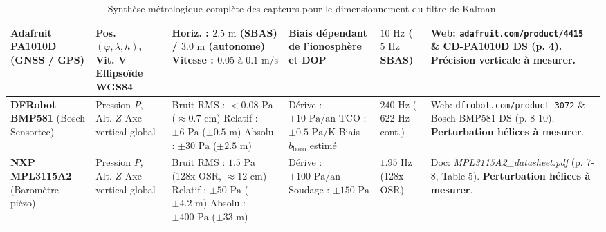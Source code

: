 \documentclass[../Formulations_Kalman.tex]{subfiles}
\begin{document}
\begin{table}[htbp]
\begin{tabular}{p{2.6cm} p{2.2cm} p{3.2cm} p{2.5cm} p{1.1cm} p{4.0cm}}
\midrule
\textbf{Adafruit PA1010D} \newline (GNSS / GPS) & Pos. $(\varphi, \lambda, h)$, Vit. $\mathbf{V}$ \newline Ellipsoïde WGS84 & Horiz. : $2.5\text{ m}$ (SBAS) / $3.0\text{ m}$ (autonome) \newline Vitesse : $0.05\text{ à }0.1\text{ m/s}$ & Biais dépendant de l'ionosphère et DOP & $10\text{ Hz}$ \newline ($5\text{ Hz}$ SBAS) & Web: \texttt{adafruit.com/product/4415} \& CD-PA1010D DS (p. 4). \newline \textbf{Précision verticale à mesurer}. \\
\midrule
\textbf{DFRobot BMP581} \newline (Bosch Sensortec) & Pression $P$, Alt. $Z$ \newline Axe vertical global & Bruit RMS : $< 0.08\text{ Pa}$ ($\approx 0.7\text{ cm}$) \newline Relatif : $\pm 6\text{ Pa}$ ($\pm 0.5\text{ m}$) \newline Absolu : $\pm 30\text{ Pa}$ ($\pm 2.5\text{ m}$) & Dérive : $\pm 10\text{ Pa/an}$ \newline TCO : $\pm 0.5\text{ Pa/K}$ \newline Biais $b_{\text{baro}}$ estimé & $240\text{ Hz}$ \newline ($622\text{ Hz}$ cont.) & Web: \texttt{dfrobot.com/product-3072} \& Bosch BMP581 DS (p. 8-10). \newline \textbf{Perturbation hélices à mesurer}. \\
\midrule
\textbf{NXP MPL3115A2} \newline (Baromètre piézo) & Pression $P$, Alt. $Z$ \newline Axe vertical global & Bruit RMS : $1.5\text{ Pa}$ (128x OSR, $\approx 12\text{ cm}$) \newline Relatif : $\pm 50\text{ Pa}$ ($\pm 4.2\text{ m}$) \newline Absolu : $\pm 400\text{ Pa}$ ($\pm 33\text{ m}$) & Dérive : $\pm 100\text{ Pa/an}$ \newline Soudage : $\pm 150\text{ Pa}$ & $1.95\text{ Hz}$ \newline (128x OSR) & Doc: \textit{MPL3115A2\_datasheet.pdf} (p. 7-8, Table 5). \newline \textbf{Perturbation hélices à mesurer}. \\
\bottomrule
\end{tabular}
\caption{Synthèse métrologique complète des capteurs pour le dimensionnement du filtre de Kalman.}
\label{tab:synthese_metrologique_capteurs}
\end{table}
\end{document}
